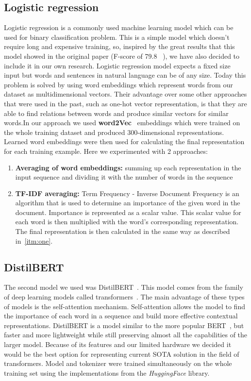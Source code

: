 \documentclass[10pt, a4paper]{article}
\begin{document}
\subsection{Logistic regression}
Logistic regression is a commonly used machine learning model which can be used for binary classification problem.
This is a simple model which doesn't require long and expensive training, so, inspired by the great results that this model showed in the original paper (F-score of 79.8 ~\citep{turcan-mckeown-2019-dreaddit}), we have also decided to
include it in our own research.
\hfill \break
\hfill \break
Logistic regression model expects a fixed size input but words and sentences in natural language can be of any size.
Today this problem is solved by using word embeddings which represent words from our dataset as multidimensional vectors. Their advantage over some other approaches that were used in the past, such as one-hot vector representation, is that they are able to find relations between words and produce similar vectors for similar words.In our approach we used \textbf{word2Vec}~\citep{mikolov2013efficient} embeddings which were trained on the whole training dataset and produced 300-dimensional representations.
Learned word embeddings were then used for calculating the final representation for each training example.
Here we experimented with 2 approaches:
\begin{enumerate}
    \item \label{itm:one} \textbf{Averaging of word embeddings:} summing up each representation in the input sequence and dividing it with the number of words in the sequence
    \item \textbf{TF-IDF averaging:} Term Frequency - Inverse Document Frequency is an algorithm that is used to determine an importance of the given word in the document.
    Importance is represented as a scalar value.
     This scalar value for each word is then multiplied with the word's corresponding representation.
    The final representation is then calculated in the same way as described in~\ref{itm:one}.

\end{enumerate}

\subsection{DistilBERT}
The second model we used was DistilBERT~\citep{sanh2020distilbert}.
This model comes from the family of deep learning models called transformers~\citep{vaswani2017attention}.
The main advantage of these types of models is the self-attention mechanism.
Self-attention allows the model to find the importance of each word in a sequence and build more effective contextual representations.
\hfill \break
\hfill \break
DistilBERT is a model similar to the more popular BERT~\citep{devlin2019bert}, but faster and more lightweight while still preserving almost all the capabilities of the larger model.
Because of its features and our limited hardware we decided it would be the best option for representing current SOTA solution in the field of transformers.
Model and tokenizer were trained simultaneously on the whole training set using the implementations from the \textit{HuggingFace} library.
\end{document}
